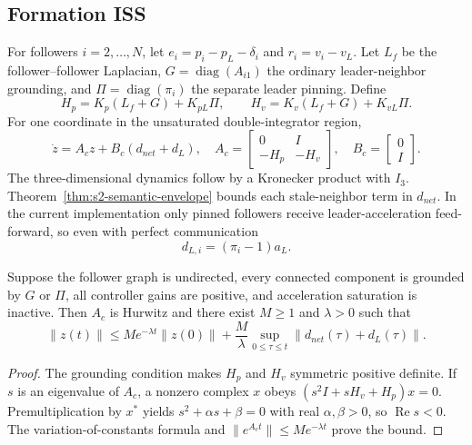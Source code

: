 \subsection{Formation ISS}

For followers $i=2,\ldots,N$, let
$e_i=p_i-p_L-\delta_i$ and $r_i=v_i-v_L$.  Let $L_f$ be the
follower--follower Laplacian, $G=\operatorname{diag}(A_{i1})$ the ordinary
leader-neighbor grounding, and $\Pi=\operatorname{diag}(\pi_i)$ the separate
leader pinning.  Define
\begin{equation}
H_p=K_p(L_f+G)+K_{pL}\Pi,\qquad
H_v=K_v(L_f+G)+K_{vL}\Pi.
\label{eq:s2-grounded-matrices}
\end{equation}
For one coordinate in the unsaturated double-integrator region,
\begin{equation}
\dot z=A_cz+B_c(d_{net}+d_L),\quad
A_c=\begin{bmatrix}0&I\\-H_p&-H_v\end{bmatrix},\quad
B_c=\begin{bmatrix}0\\I\end{bmatrix}.
\label{eq:s2-error-system}
\end{equation}
The three-dimensional dynamics follow by a Kronecker product with $I_3$.
Theorem~\ref{thm:s2-semantic-envelope} bounds each stale-neighbor term in
$d_{net}$.  In the current implementation only pinned followers receive
leader-acceleration feed-forward, so even with perfect communication
\begin{equation}
d_{L,i}=(\pi_i-1)a_L.
\label{eq:s2-leader-mismatch}
\end{equation}

\begin{theorem}
Suppose the follower graph is undirected, every connected component is
grounded by $G$ or $\Pi$, all controller gains are positive, and acceleration
saturation is inactive.  Then $A_c$ is Hurwitz and there exist $M\ge1$ and
$\lambda>0$ such that
\begin{equation}
\|z(t)\|\le Me^{-\lambda t}\|z(0)\|
+\frac{M}{\lambda}
\sup_{0\le\tau\le t}\|d_{net}(\tau)+d_L(\tau)\|.
\label{eq:s2-iss-bound}
\end{equation}
\label{thm:s2-formation-iss}
\end{theorem}

\begin{proof}
The grounding condition makes $H_p$ and $H_v$ symmetric positive definite.
If $s$ is an eigenvalue of $A_c$, a nonzero complex $x$ obeys
$(s^2I+sH_v+H_p)x=0$.  Premultiplication by $x^*$ yields
$s^2+\alpha s+\beta=0$ with real $\alpha,\beta>0$, so
$\operatorname{Re}s<0$.  The variation-of-constants formula and
$\|e^{A_ct}\|\le Me^{-\lambda t}$ prove the bound.
\end{proof}

